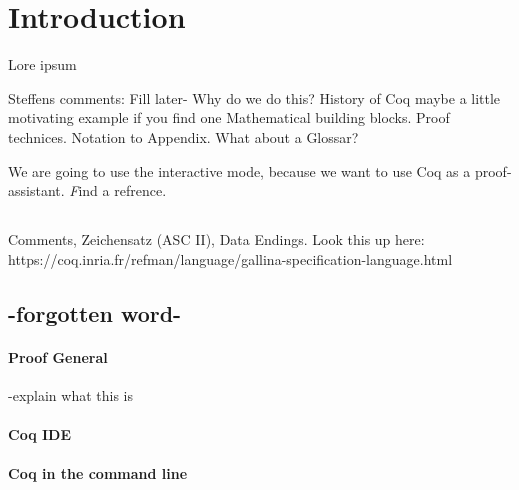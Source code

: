 \section{Introduction}

Lore ipsum \cite{PACGGHSY}

Steffens comments:
Fill later-
 Why do we do this?
 History of Coq
 maybe a little motivating example if you find one
 Mathematical building blocks. Proof technices. Notation to Appendix.
 What about a Glossar?

We are going to use the interactive mode, because we want to use Coq as a proof-assistant. {\emph Find a refrence.}

\subsection{}

Comments, Zeichensatz (ASC II), Data Endings.
Look this up here:\\
https://coq.inria.fr/refman/language/gallina-specification-language.html
\subsection{-forgotten word-}



\paragraph{Proof General}
-explain what this is


\paragraph{Coq IDE}

\paragraph{Coq in the command line}




